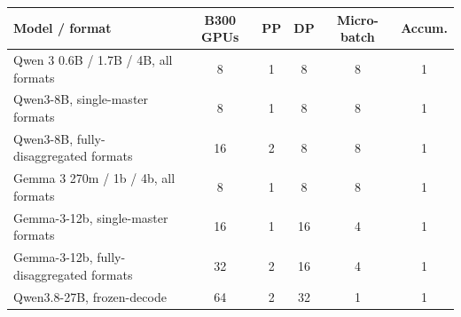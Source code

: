 \begin{tabular}{lccccc}
\toprule
Model / format & B300 GPUs & PP & DP & Micro-batch & Accum. \\
\midrule
Qwen 3 0.6B / 1.7B / 4B, all formats & 8 & 1 & 8 & 8 & 1 \\
Qwen3-8B, single-master formats & 8 & 1 & 8 & 8 & 1 \\
Qwen3-8B, fully-disaggregated formats & 16 & 2 & 8 & 8 & 1 \\
Gemma 3 270m / 1b / 4b, all formats & 8 & 1 & 8 & 8 & 1 \\
Gemma-3-12b, single-master formats & 16 & 1 & 16 & 4 & 1 \\
Gemma-3-12b, fully-disaggregated formats & 32 & 2 & 16 & 4 & 1 \\
Qwen3.8-27B, frozen-decode & 64 & 2 & 32 & 1 & 1 \\
\bottomrule
\end{tabular}
